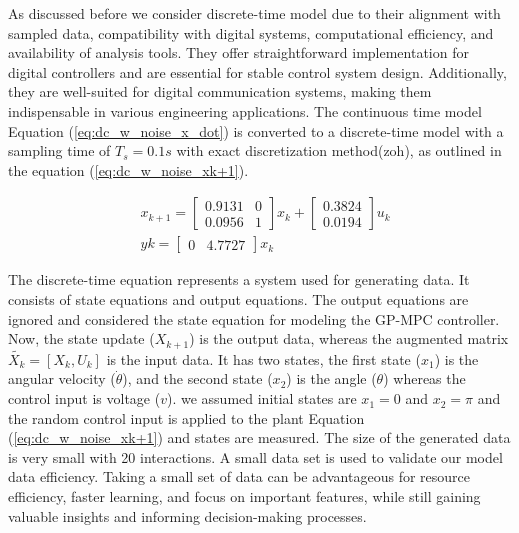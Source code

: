 As discussed before we consider discrete-time model due to their alignment with sampled data, compatibility with digital systems, computational efficiency, and availability of analysis tools. They offer straightforward implementation for digital controllers and are essential for stable control system design. Additionally, they are well-suited for digital communication systems, making them indispensable in various engineering applications. The continuous time model Equation (\ref{eq:dc_w_noise_x_dot}) is converted to a discrete-time model with a sampling time of $T_s=0.1s$ with exact discretization method(zoh), as outlined in the equation (\ref{eq:dc_w_noise_xk+1}).

\begin{equation} \label{eq:dc_w_noise_xk+1}
\begin{aligned}
        & x_{k+1} = \begin{bmatrix}
        0.9131 & 0 \\ 
        0.0956 & 1
    \end{bmatrix} x_k + \begin{bmatrix}
        0.3824 \\ 0.0194
    \end{bmatrix} u_k \\
    & yk = \begin{bmatrix}
        0 & 4.7727
    \end{bmatrix} x_k
\end{aligned}
\end{equation}

The discrete-time equation represents a system used for generating data. It consists of state equations and output equations. The output equations are ignored and considered the state equation for modeling the GP-MPC controller. Now, the state update ($X_{k+1}$) is the output data, whereas the augmented matrix $\tilde{X_k}=[X_k,U_k]$ is the input data. It has two states, the first state ($x_1$) is the angular velocity ($\dot{\theta}$), and the second state ($x_2$) is the angle ($\theta$) whereas the control input is voltage ($v$). we assumed initial states are $x_1 = 0$ and $x_2=\pi$ and the random control input is applied to the plant Equation (\ref{eq:dc_w_noise_xk+1}) and states are measured. The size of the generated data is very small with 20 interactions. A small data set is used to validate our model data efficiency. Taking a small set of data can be advantageous for resource efficiency, faster learning, and focus on important features, while still gaining valuable insights and informing decision-making processes.

